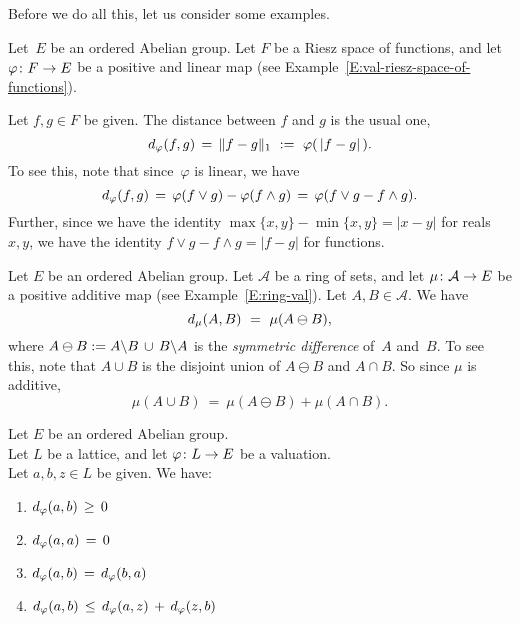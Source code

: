 \documentclass[main.tex]{subfiles}
\begin{document}
Before we do all this,
let us consider some examples.
%
%
\begin{ex}
\label{E:d-riesz}
Let~$E$ be an ordered Abelian group.
Let $F$ be a Riesz space of functions,
and let $\varphi\colon F\rightarrow E$ be
a positive and linear map
(see Example~\ref{E:val-riesz-space-of-functions}).

Let $f,g\in F$ be given.
The distance between $f$ and $g$ is the usual one,
\begin{equation*}
d_{\smash{\varphi}}(f,g) \,=\, \|f-g\|_1 \ :=\ \varphi(\,|f-g|\,).
\end{equation*}
To see this,
note that since~$\varphi$ is linear,
we have 
\begin{equation*}
d_{\smash{\varphi}}(f,g) \,=\, 
\varphi(f\vee g) - \varphi(f\wedge g)
\,=\, \varphi(f\vee g - f\wedge g).
\end{equation*}
Further,
since we have the identity $\max\{x,y\} - \min\{x,y\} = |x-y|$
for reals $x,y$,
we have the identity $f\vee g - f\wedge g = |f-g|$
for functions.
\end{ex}
\begin{ex}
Let $E$ be an ordered Abelian group.
Let $\mathcal{A}$ be a ring of sets,
and let $\mu\colon \mathcal{A}\rightarrow E$
be a positive additive map
(see Example~\ref{E:ring-val}).
Let $A,B\in\mathcal{A}$.
We have
\begin{equation*}
d_{\smash{\mu}}(A,B) \ =\ \mu(A \ominus B),
\end{equation*}
where $A\ominus B := A\backslash B \,\cup\, B\backslash A$
is the \emph{symmetric difference} of~$A$ and~$B$.
To see this, note that $A\cup B$ is the disjoint union
of $A\ominus B$ and $A\cap B$. So
since $\mu$ is additive, 
\begin{equation*}
\mu(A\cup B) \ =\ \mu(A\ominus B) + \mu(A\cap B).
\end{equation*}
\end{ex}
%
%
\begin{lem}
\label{L:d-metric}
Let $E$ be an ordered Abelian group.\\
Let $L$ be a lattice,
and let $\varphi\colon L \rightarrow E$ be a valuation.\\
Let $a,b,z\in L$ be given.
We have:
\begin{enumerate}
\item \label{d-metric_pos}
$d_{\smash{\varphi}}(a,b)\,\geq\, 0$
\item\label{d-metric_self} 
$d_{\smash{\varphi}}(a,a)\,=\,0$
\item\label{d-metric_sym}
$d_{\smash{\varphi}}(a,b)\,=\,d_{\smash{\varphi}}(b,a)$
\item\label{d-metric_triangle}
$d_{\smash{\varphi}}(a,b)\,\leq\,d_{\smash{\varphi}}(a,z)\,+\,d_{\smash{\varphi}}(z,b)$
\end{enumerate}
\end{lem}
\end{document}
